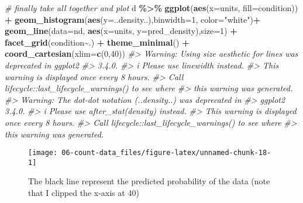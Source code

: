 \documentclass[
]{book}
\newenvironment{Shaded}{\begin{snugshade}}{\end{snugshade}}
\newcommand{\AttributeTok}[1]{\textcolor[rgb]{0.13,0.29,0.53}{#1}}
\newcommand{\CommentTok}[1]{\textcolor[rgb]{0.56,0.35,0.01}{\textit{#1}}}
\newcommand{\DecValTok}[1]{\textcolor[rgb]{0.00,0.00,0.81}{#1}}
\newcommand{\FunctionTok}[1]{\textcolor[rgb]{0.13,0.29,0.53}{\textbf{#1}}}
\newcommand{\NormalTok}[1]{#1}
\newcommand{\SpecialCharTok}[1]{\textcolor[rgb]{0.81,0.36,0.00}{\textbf{#1}}}
\newcommand{\StringTok}[1]{\textcolor[rgb]{0.31,0.60,0.02}{#1}}
\begin{document}
\begin{Shaded}
\begin{Highlighting}[]
\CommentTok{\# finally take all together and plot}
\NormalTok{d }\SpecialCharTok{\%\textgreater{}\%}
  \FunctionTok{ggplot}\NormalTok{(}\FunctionTok{aes}\NormalTok{(}\AttributeTok{x=}\NormalTok{units, }\AttributeTok{fill=}\NormalTok{condition)) }\SpecialCharTok{+}
  \FunctionTok{geom\_histogram}\NormalTok{(}\FunctionTok{aes}\NormalTok{(}\AttributeTok{y=}\NormalTok{..density..),}\AttributeTok{binwidth=}\DecValTok{1}\NormalTok{, }\AttributeTok{color=}\StringTok{"white"}\NormalTok{)}\SpecialCharTok{+}
  \FunctionTok{geom\_line}\NormalTok{(}\AttributeTok{data=}\NormalTok{nd, }\FunctionTok{aes}\NormalTok{(}\AttributeTok{x=}\NormalTok{units, }\AttributeTok{y=}\NormalTok{pred\_density),}\AttributeTok{size=}\DecValTok{1}\NormalTok{) }\SpecialCharTok{+}
  \FunctionTok{facet\_grid}\NormalTok{(condition}\SpecialCharTok{\textasciitilde{}}\NormalTok{.) }\SpecialCharTok{+}
  \FunctionTok{theme\_minimal}\NormalTok{() }\SpecialCharTok{+}
  \FunctionTok{coord\_cartesian}\NormalTok{(}\AttributeTok{xlim=}\FunctionTok{c}\NormalTok{(}\DecValTok{0}\NormalTok{,}\DecValTok{40}\NormalTok{))}
\CommentTok{\#\textgreater{} Warning: Using \textasciigrave{}size\textasciigrave{} aesthetic for lines was deprecated in ggplot2}
\CommentTok{\#\textgreater{} 3.4.0.}
\CommentTok{\#\textgreater{} i Please use \textasciigrave{}linewidth\textasciigrave{} instead.}
\CommentTok{\#\textgreater{} This warning is displayed once every 8 hours.}
\CommentTok{\#\textgreater{} Call \textasciigrave{}lifecycle::last\_lifecycle\_warnings()\textasciigrave{} to see where}
\CommentTok{\#\textgreater{} this warning was generated.}
\CommentTok{\#\textgreater{} Warning: The dot{-}dot notation (\textasciigrave{}..density..\textasciigrave{}) was deprecated in}
\CommentTok{\#\textgreater{} ggplot2 3.4.0.}
\CommentTok{\#\textgreater{} i Please use \textasciigrave{}after\_stat(density)\textasciigrave{} instead.}
\CommentTok{\#\textgreater{} This warning is displayed once every 8 hours.}
\CommentTok{\#\textgreater{} Call \textasciigrave{}lifecycle::last\_lifecycle\_warnings()\textasciigrave{} to see where}
\CommentTok{\#\textgreater{} this warning was generated.}
\end{Highlighting}
\end{Shaded}

\begin{figure}

{\centering \texttt{[image: 06-count-data\_files/figure-latex/unnamed-chunk-18-1]} 

}

\caption{The black line represent the predicted probability of the data (note that I clipped the x-axis at 40)}\label{fig:unnamed-chunk-18}
\end{figure}
\end{document}
